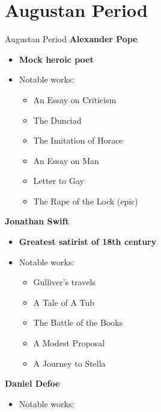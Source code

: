 \documentclass[
  12pt,
    progressbar=frametitle]{beamer}
\providecommand{\tightlist}{%
  \setlength{\itemsep}{0pt}\setlength{\parskip}{0pt}}
\begin{document}
\section{Augustan Period}
\begin{frame}[allowframebreaks]
{Augustan Period}
\large\textbf{Alexander Pope}\normalsize\vspace{-3mm}

\begin{itemize}
\tightlist
\item
  \textbf{Mock heroic poet}
\item
  Notable works:

  \begin{itemize}
  \tightlist
  \item
    An Essay on Criticism
  \item
    The Dunciad
  \item
    The Imitation of Horace
  \item
    An Essay on Man
  \item
    Letter to Gay
  \item
    The Rape of the Lock (epic)
  \end{itemize}
\end{itemize}

\vspace{15mm}
\large\textbf{Jonathan Swift}\normalsize\vspace{-3mm}

\begin{itemize}
\tightlist
\item
  \textbf{Greatest satirist of 18th century}
\item
  Notable works:

  \begin{itemize}
  \tightlist
  \item
    Gulliver's travels
  \item
    A Tale of A Tub
  \item
    The Battle of the Books
  \item
    A Modest Proposal
  \item
    A Journey to Stella
  \end{itemize}
\end{itemize}

\vspace{15mm}
\large\textbf{Daniel Defoe}\normalsize\vspace{-3mm}

\begin{itemize}
\tightlist
\item
  Notable works:


\end{itemize}
\end{frame}
\end{document}
